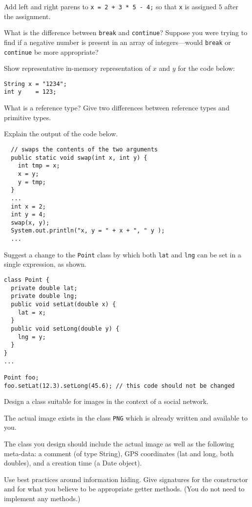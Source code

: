 \documentclass[11pt]{exam}
\begin{document}
\begin{questions}

\question[3] Add left and right parens to \texttt{x = 2 + 3 * 5 - 4;} so that \texttt{x} is assigned 
$5$ after the assignment.

\question[4] What is the difference between {\tt break} and {\tt continue}? Suppose you were trying to find
if a negative number  is present in an array of integers---would {\tt break} or {\tt continue} be more appropriate?

\question[7] Show representative in-memory representation of $x$ and $y$ for the code below:
\begin{verbatim}
String x = "1234";
int y    = 123;
\end{verbatim}

\question[6] What is a reference type? Give two differences between reference types and primitive types.

\question[6] Explain the output of the code below.
\begin{verbatim}
  // swaps the contents of the two arguments
  public static void swap(int x, int y) {
    int tmp = x;
    x = y;
    y = tmp;
  }
  ...
  int x = 2;
  int y = 4;
  swap(x, y);
  System.out.println("x, y = " + x + ", " y );
  ...
\end{verbatim}

\question[6] Suggest a change to the {\tt Point} class by which both {\tt lat} and {\tt lng} can be set in a single 
expression, as shown.
\begin{verbatim}
class Point {
  private double lat;
  private double lng;
  public void setLat(double x) {
    lat = x;
  }
  public void setLong(double y) {
    lng = y;
  }
}
...

Point foo;
foo.setLat(12.3).setLong(45.6); // this code should not be changed
\end{verbatim}

\question[12] Design a class suitable for images in the context of a social network.

The actual image exists in the class {\tt PNG} which is already written and available to you. 

The class you design should include
the actual image as well as the following meta-data: a comment (of type String), GPS coordinates
(lat and long, both doubles), and a creation time (a Date object). 

Use best practices around information hiding.
Give signatures for the constructor and for what you believe to be appropriate getter methods.
(You do not need to implement any methods.)


\end{questions}
\end{document}
